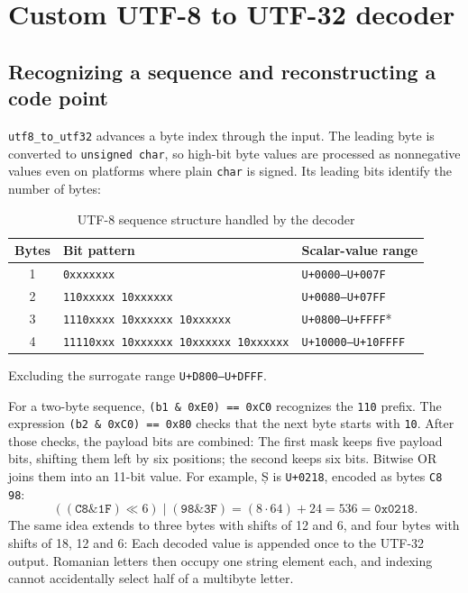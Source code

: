 \documentclass{utmreport}
\newcommand{\sourceexcerpt}[2]{\VerbatimInput[firstline=#1,lastline=#2]{../src/main.cpp}}
\begin{document}
\section{Custom UTF-8 to UTF-32 decoder}
\subsection{Recognizing a sequence and reconstructing a code point}
\texttt{utf8\_to\_utf32} advances a byte index through the input. The leading byte is converted to \texttt{unsigned char}, so high-bit byte values are processed as nonnegative values even on platforms where plain \texttt{char} is signed. Its leading bits identify the number of bytes:

\begin{table}[htbp]
\centering
\caption{UTF-8 sequence structure handled by the decoder}
\begin{tabular}{c l l}
\hline
Bytes & Bit pattern & Scalar-value range\\
\hline
1 & \texttt{0xxxxxxx} & \texttt{U+0000--U+007F}\\
2 & \texttt{110xxxxx 10xxxxxx} & \texttt{U+0080--U+07FF}\\
3 & \texttt{1110xxxx 10xxxxxx 10xxxxxx} & \texttt{U+0800--U+FFFF}*\\
4 & \texttt{11110xxx 10xxxxxx 10xxxxxx 10xxxxxx} & \texttt{U+10000--U+10FFFF}\\
\hline
\end{tabular}
\par\smallskip\footnotesize *Excluding the surrogate range \texttt{U+D800--U+DFFF}.
\end{table}

For a two-byte sequence, \texttt{(b1 \& 0xE0) == 0xC0} recognizes the \texttt{110} prefix. The expression \texttt{(b2 \& 0xC0) == 0x80} checks that the next byte starts with \texttt{10}. After those checks, the payload bits are combined:
\sourceexcerpt{38}{38}
The first mask keeps five payload bits, shifting them left by six positions; the second keeps six bits. Bitwise OR joins them into an 11-bit value. For example, Ș is \texttt{U+0218}, encoded as bytes \texttt{C8 98}:
\begin{equation}
((\mathtt{C8}\mathbin{\&}\mathtt{1F})\ll6)
\mathbin{|}(\mathtt{98}\mathbin{\&}\mathtt{3F})
=(8\cdot64)+24=536=\mathtt{0x0218}.
\end{equation}
The same idea extends to three bytes with shifts of 12 and 6, and four bytes with shifts of 18, 12 and 6:
\sourceexcerpt{78}{81}
Each decoded value is appended once to the UTF-32 output. Romanian letters then occupy one string element each, and indexing cannot accidentally select half of a multibyte letter.
\end{document}

